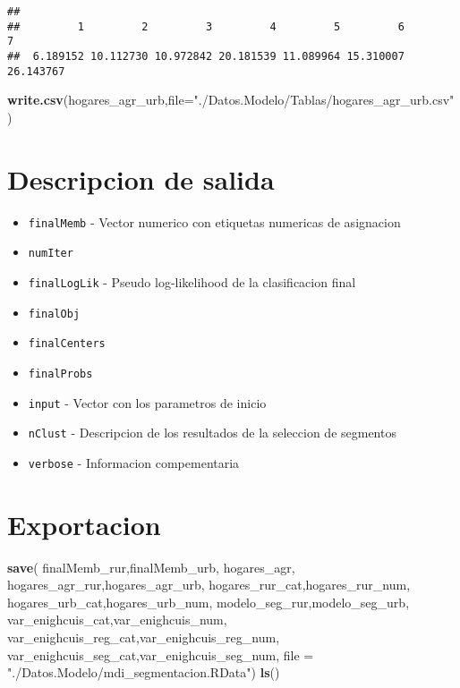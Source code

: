 \documentclass[11pt,]{article}
\newenvironment{Shaded}{\begin{snugshade}}{\end{snugshade}}
\newcommand{\KeywordTok}[1]{\textcolor[rgb]{0.13,0.29,0.53}{\textbf{#1}}}
\newcommand{\DataTypeTok}[1]{\textcolor[rgb]{0.13,0.29,0.53}{#1}}
\newcommand{\StringTok}[1]{\textcolor[rgb]{0.31,0.60,0.02}{#1}}
\newcommand{\NormalTok}[1]{#1}
\begin{document}
\begin{verbatim}
## 
##         1         2         3         4         5         6         7 
##  6.189152 10.112730 10.972842 20.181539 11.089964 15.310007 26.143767
\end{verbatim}

\begin{Shaded}
\begin{Highlighting}[]
\KeywordTok{write.csv}\NormalTok{(hogares_agr_urb,}\DataTypeTok{file=}\StringTok{"./Datos.Modelo/Tablas/hogares_agr_urb.csv"}\NormalTok{)}
\end{Highlighting}
\end{Shaded}

\section{Descripcion de salida}\label{descripcion-de-salida}

\begin{itemize}
\item
  \texttt{finalMemb} - Vector numerico con etiquetas numericas de
  asignacion
\item
  \texttt{numIter}
\item
  \texttt{finalLogLik} - Pseudo log-likelihood de la clasificacion final
\item
  \texttt{finalObj}
\item
  \texttt{finalCenters}
\item
  \texttt{finalProbs}
\item
  \texttt{input} - Vector con los parametros de inicio
\item
  \texttt{nClust} - Descripcion de los resultados de la seleccion de
  segmentos
\item
  \texttt{verbose} - Informacion compementaria
\end{itemize}

\section{Exportacion}\label{exportacion}

\begin{Shaded}
\begin{Highlighting}[]
\KeywordTok{save}\NormalTok{( finalMemb_rur,finalMemb_urb,}
\NormalTok{      hogares_agr,}
\NormalTok{      hogares_agr_rur,hogares_agr_urb,}
\NormalTok{      hogares_rur_cat,hogares_rur_num,}
\NormalTok{      hogares_urb_cat,hogares_urb_num,}
\NormalTok{      modelo_seg_rur,modelo_seg_urb,}
\NormalTok{      var_enighcuis_cat,var_enighcuis_num,}
\NormalTok{      var_enighcuis_reg_cat,var_enighcuis_reg_num,}
\NormalTok{      var_enighcuis_seg_cat,var_enighcuis_seg_num,}
     \DataTypeTok{file =} \StringTok{"./Datos.Modelo/mdi_segmentacion.RData"}\NormalTok{)}
\KeywordTok{ls}\NormalTok{()}
\end{Highlighting}
\end{Shaded}
\end{document}
